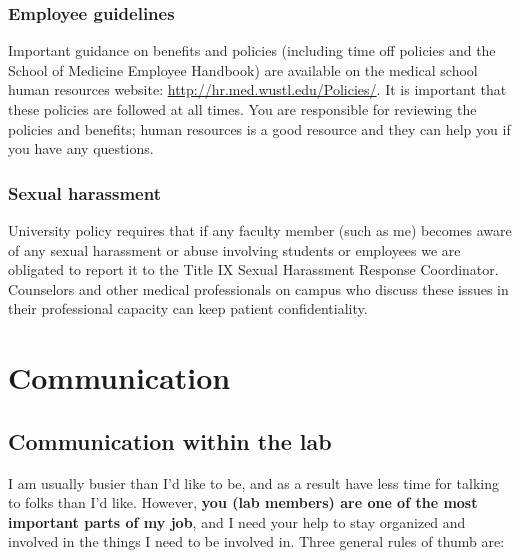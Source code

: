 \documentclass[letterpaper,12pt,oneside]{memoir}
\begin{document}
\subsection{Employee guidelines}
Important guidance on benefits and policies (including time off policies and the School of Medicine Employee Handbook) are available on the medical school human resources website: \url{http://hr.med.wustl.edu/Policies/}. It is important that these policies are followed at all times. You are responsible for reviewing the policies and benefits; human resources is a good resource and they can help you if you have any questions.

\subsection{Sexual harassment}
University policy requires that if any faculty member (such as me) becomes aware of any sexual harassment or abuse involving students or employees we are obligated to report it to the Title IX Sexual Harassment Response Coordinator. Counselors and other medical professionals on campus who discuss these issues in their professional capacity can keep patient confidentiality.




\chapter{Communication}
\section{Communication within the lab}
\label{sec:communicationInLab}

I am usually busier than I'd like to be, and as a result have less time for talking to folks than I'd like. However, \textbf{you (lab members) are one of the most important parts of my job}, and I need your help to stay organized and involved in the things I need to be involved in. Three general rules of thumb are:
\end{document}
